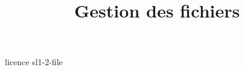 \documentclass [xcolor=table] {beamer}
\title {Gestion des fichiers}
\begin{document}
 {licence}
 {sl1-2-file}
\end{document}
